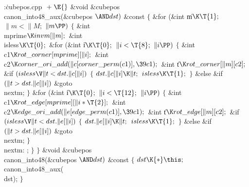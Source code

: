 \Y\B\4:\.{cubepos.cpp }\X${}\mathrel+\E{}$\6
\&{void} \&{cubepos}\DC\\{canon\_into48\_aux}(\&{cubepos} ${}{\AND}\\{dst}){}$ %
\&{const}\1\1\2\2\6
${}\{{}$\1\6
\&{for} (\&{int} \|m${}\K\T{1};{}$ ${}\|m<\|M;{}$ ${}\|m\PP){}$\5
${}\{{}$\1\6
\&{int} \\{mprime}${}\K\\{invm}[\|m];{}$\6
\&{int} \\{isless}${}\K\T{0};{}$\7
\&{for} (\&{int} \|i${}\K\T{0};{}$ ${}\|i<\T{8};{}$ ${}\|i\PP){}$\5
${}\{{}$\1\6
\&{int} \\{c1}${}\K\\{rot\_corner}[\\{mprime}][\|i];{}$\6
\&{int} \\{c2}${}\K\\{corner\_ori\_add}(\|c[\\{corner\_perm}(\\{c1})],\39%
\\{c1});{}$\6
\&{int} \|t${}\K\\{rot\_corner}[\|m][\\{c2}];{}$\7
\&{if} ${}(\\{isless}\V\|t<\\{dst}.\|c[\|i]){}$\5
${}\{{}$\1\6
${}\\{dst}.\|c[\|i]\K\|t;{}$\6
${}\\{isless}\K\T{1};{}$\6
\4${}\}{}$\2\6
\&{else} \&{if} ${}(\|t>\\{dst}.\|c[\|i]){}$\1\5
\&{goto} \\{nextm};\2\6
\4${}\}{}$\2\6
\&{for} (\&{int} \|i${}\K\T{0};{}$ ${}\|i<\T{12};{}$ ${}\|i\PP){}$\5
${}\{{}$\1\6
\&{int} \\{c1}${}\K\\{rot\_edge}[\\{mprime}][\|i*\T{2}];{}$\6
\&{int} \\{c2}${}\K\\{edge\_ori\_add}(\|e[\\{edge\_perm}(\\{c1})],\39%
\\{c1});{}$\6
\&{int} \|t${}\K\\{rot\_edge}[\|m][\\{c2}];{}$\7
\&{if} ${}(\\{isless}\V\|t<\\{dst}.\|e[\|i]){}$\5
${}\{{}$\1\6
${}\\{dst}.\|e[\|i]\K\|t;{}$\6
${}\\{isless}\K\T{1};{}$\6
\4${}\}{}$\2\6
\&{else} \&{if} ${}(\|t>\\{dst}.\|e[\|i]){}$\1\5
\&{goto} \\{nextm};\2\6
\4${}\}{}$\2\6
\4\\{nextm}:\5
;\6
\4${}\}{}$\2\6
\4${}\}{}$\2\7
\&{void} \&{cubepos}\DC\\{canon\_into48}(\&{cubepos} ${}{\AND}\\{dst}){}$ %
\&{const}\1\1\2\2\6
${}\{{}$\1\6
${}\\{dst}\K{*}\this;{}$\6
\\{canon\_into48\_aux}(\\{dst});\6
\4${}\}{}$\2\par
\fi

